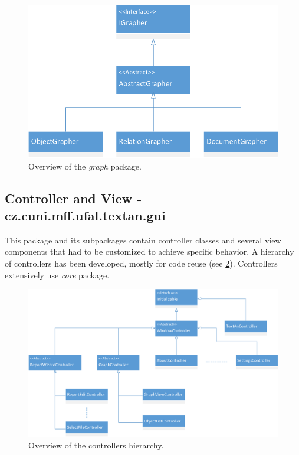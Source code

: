 \begin{figure}[!htb]
        \centering
        \includegraphics[width=\textwidth]{Images/Graph}
        \caption{Overview of the \emph{graph} package.}
        \label{fig:Graph}
\end{figure}

\subsection{Controller and View - cz.cuni.mff.ufal.textan.gui}

This package and its subpackages contain controller classes and several view
components that had to be customized to achieve specific behavior. A hierarchy
of controllers has been developed, mostly for code reuse (see
\ref{fig:Controllers}). Controllers extensively use \emph{core} package.

\begin{figure}[!htb]
        \centering
        \includegraphics[width=\textwidth]{Images/Controllers}
        \caption{Overview of the controllers hierarchy.}
        \label{fig:Controllers}
\end{figure}

